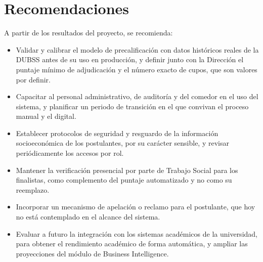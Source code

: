 \newpage
\section{Recomendaciones}\label{sec:feria_recomendaciones}

A partir de los resultados del proyecto, se recomienda:

\begin{itemize}
    \item Validar y calibrar el modelo de precalificación con datos históricos reales de la DUBSS antes de su uso en producción, y definir junto con la Dirección el puntaje mínimo de adjudicación y el número exacto de cupos, que son valores por definir.
    \item Capacitar al personal administrativo, de auditoría y del comedor en el uso del sistema, y planificar un periodo de transición en el que convivan el proceso manual y el digital.
    \item Establecer protocolos de seguridad y resguardo de la información socioeconómica de los postulantes, por su carácter sensible, y revisar periódicamente los accesos por rol.
    \item Mantener la verificación presencial por parte de Trabajo Social para los finalistas, como complemento del puntaje automatizado y no como su reemplazo.
    \item Incorporar un mecanismo de apelación o reclamo para el postulante, que hoy no está contemplado en el alcance del sistema.
    \item Evaluar a futuro la integración con los sistemas académicos de la universidad, para obtener el rendimiento académico de forma automática, y ampliar las proyecciones del módulo de Business Intelligence.
\end{itemize}
